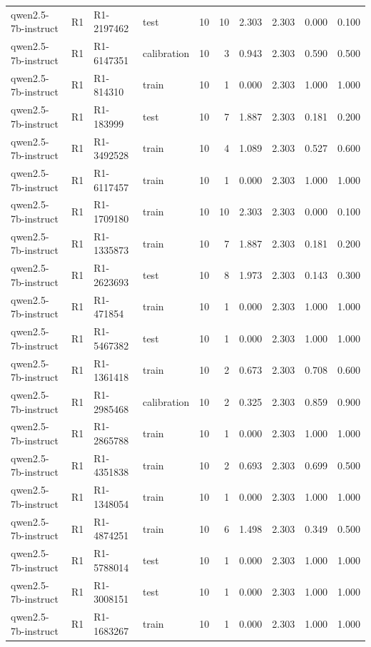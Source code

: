 \begin{table}
\begin{tabular}{llllrrrrrr}
qwen2.5-7b-instruct & R1 & R1-2197462 & test & 10 & 10 & 2.303 & 2.303 & 0.000 & 0.100 \\
qwen2.5-7b-instruct & R1 & R1-6147351 & calibration & 10 & 3 & 0.943 & 2.303 & 0.590 & 0.500 \\
qwen2.5-7b-instruct & R1 & R1-814310 & train & 10 & 1 & 0.000 & 2.303 & 1.000 & 1.000 \\
qwen2.5-7b-instruct & R1 & R1-183999 & test & 10 & 7 & 1.887 & 2.303 & 0.181 & 0.200 \\
qwen2.5-7b-instruct & R1 & R1-3492528 & train & 10 & 4 & 1.089 & 2.303 & 0.527 & 0.600 \\
qwen2.5-7b-instruct & R1 & R1-6117457 & train & 10 & 1 & 0.000 & 2.303 & 1.000 & 1.000 \\
qwen2.5-7b-instruct & R1 & R1-1709180 & train & 10 & 10 & 2.303 & 2.303 & 0.000 & 0.100 \\
qwen2.5-7b-instruct & R1 & R1-1335873 & train & 10 & 7 & 1.887 & 2.303 & 0.181 & 0.200 \\
qwen2.5-7b-instruct & R1 & R1-2623693 & test & 10 & 8 & 1.973 & 2.303 & 0.143 & 0.300 \\
qwen2.5-7b-instruct & R1 & R1-471854 & train & 10 & 1 & 0.000 & 2.303 & 1.000 & 1.000 \\
qwen2.5-7b-instruct & R1 & R1-5467382 & test & 10 & 1 & 0.000 & 2.303 & 1.000 & 1.000 \\
qwen2.5-7b-instruct & R1 & R1-1361418 & train & 10 & 2 & 0.673 & 2.303 & 0.708 & 0.600 \\
qwen2.5-7b-instruct & R1 & R1-2985468 & calibration & 10 & 2 & 0.325 & 2.303 & 0.859 & 0.900 \\
qwen2.5-7b-instruct & R1 & R1-2865788 & train & 10 & 1 & 0.000 & 2.303 & 1.000 & 1.000 \\
qwen2.5-7b-instruct & R1 & R1-4351838 & train & 10 & 2 & 0.693 & 2.303 & 0.699 & 0.500 \\
qwen2.5-7b-instruct & R1 & R1-1348054 & train & 10 & 1 & 0.000 & 2.303 & 1.000 & 1.000 \\
qwen2.5-7b-instruct & R1 & R1-4874251 & train & 10 & 6 & 1.498 & 2.303 & 0.349 & 0.500 \\
qwen2.5-7b-instruct & R1 & R1-5788014 & test & 10 & 1 & 0.000 & 2.303 & 1.000 & 1.000 \\
qwen2.5-7b-instruct & R1 & R1-3008151 & test & 10 & 1 & 0.000 & 2.303 & 1.000 & 1.000 \\
qwen2.5-7b-instruct & R1 & R1-1683267 & train & 10 & 1 & 0.000 & 2.303 & 1.000 & 1.000 \\

\end{tabular}
\end{table}
